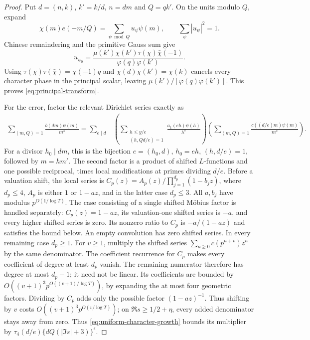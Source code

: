 \begin{proof}
Put $d=(n,k)$, $k'=k/d$, $n=dm$ and $Q=qk'$. On the units modulo
$Q$, expand
\[
 \chi(m)e(-m/Q)=\sum_{\psi\bmod Q}u_\psi\psi(m),
 \qquad \sum_\psi|u_\psi|^2=1.
\]
Chinese remaindering and the primitive Gauss sum give
\[
 u_{\psi_0}=\frac{\mu(k')\chi(k')\tau(\chi)\bar\chi(-1)}
                      {\varphi(q)\varphi(k')}.
\]
Using $\tau(\chi)\tau(\bar\chi)=\chi(-1)q$ and
$\chi(d)\chi(k')=\chi(k)$ cancels every character phase in the
principal scalar, leaving $\mu(k')/[\varphi(q)\varphi(k')]$.
This proves \eqref{eq:principal-transform}.

For the error, factor the relevant Dirichlet series exactly as
\begin{align*}
 \sum_{(m,Q)=1}\frac{b(dm)\psi(m)}{m^s}
 =\sum_{e\mid d}&\left(
 \sum_{\substack{h\le y/e\\(h,Qd/e)=1}}
              \frac{a_1(eh)\psi(h)}{h^s}\right)\left(
 \sum_{(m,Q)=1}\frac{c((d/e)m)\psi(m)}{m^s}\right).
\end{align*}
For a divisor $h_0\mid dm$, this is the bijection
$e=(h_0,d)$, $h_0=eh$, $(h,d/e)=1$, followed by $m=hm'$.
The second factor is a product of shifted $L$-functions and one
possible reciprocal, times local modifications at primes dividing
$d/e$. Before a valuation shift, the local series is
$C_p(z)=A_p(z)/\prod_{j=1}^{d_p}(1-b_jz)$, where $d_p\le4$,
$A_p$ is either $1$ or $1-a z$, and in the latter case $d_p\le3$.
All $a,b_j$ have modulus $p^{O(1/\log T)}$.
The case consisting of a single shifted M\"obius factor is handled
separately: $C_p(z)=1-a z$, its valuation-one shifted series is
$-a$, and every higher shifted series is zero. Its nonzero ratio
to $C_p$ is $-a/(1-a z)$ and satisfies the bound below. An empty
convolution has zero shifted series. In every remaining case
$d_p\ge1$.
For $v\ge1$, multiply the shifted series
$\sum_{n\ge0}c(p^{n+v})z^n$ by the same denominator.
The coefficient recurrence for $C_p$ makes every coefficient of
degree at least $d_p$ vanish. The remaining numerator therefore has
degree at most $d_p-1$; it need not be linear.
Its coefficients are bounded by
$O((v+1)^3p^{O((v+1)/\log T)})$, by expanding the at most four
geometric factors. Dividing by $C_p$ adds only the possible factor
$(1-a z)^{-1}$. Thus shifting by $v$ costs
$O((v+1)^3p^{O(v/\log T)})$; on
$\Re s\ge1/2+\eta$, every added denominator stays away from zero.
Thus \eqref{eq:uniform-character-growth} bounds its multiplier by
$\tau_4(d/e)\{dQ(|\Im s|+3)\}^\epsilon$.


\end{proof}
